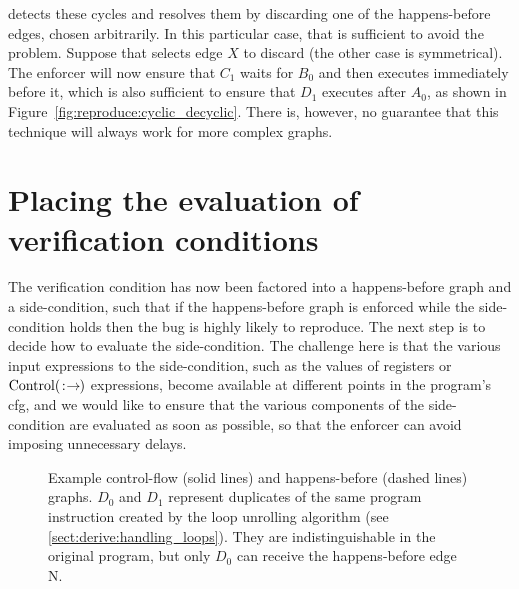 {\Technique} detects these cycles and resolves them by discarding one
of the happens-before edges, chosen arbitrarily.  In this particular
case, that is sufficient to avoid the problem.  Suppose that
{\technique} selects edge $X$ to discard (the other case is
symmetrical).  The enforcer will now ensure that $C_1$ waits for $B_0$
and then executes immediately before it, which is also sufficient to
ensure that $D_1$ executes after $A_0$, as shown in
Figure~\ref{fig:reproduce:cyclic_decyclic}.  There is, however, no
guarantee that this technique will always work for more complex
graphs.

\section{Placing the evaluation of verification conditions}
\label{sect:enforce:place_vcs}

The verification condition has now been factored into a happens-before
graph and a side-condition, such that if the happens-before graph is
enforced while the side-condition holds then the bug is highly likely
to reproduce.  The next step is to decide how to evaluate the
side-condition.  The challenge here is that the various input
expressions to the side-condition, such as the values of registers or
$\mathrm{Control}(\mathrm{}\!:\!\mathrm{\!}\!\rightarrow\!\mathrm{\!})$ expressions, become available at different
points in the program's \gls{cfg}, and we would like to ensure that
the various components of the side-condition are evaluated as soon as
possible, so that the enforcer can avoid imposing unnecessary delays.

\begin{figure}
  \vspace{-8pt}
  \vspace{-4pt}
  \caption{Example control-flow (solid lines) and happens-before
    (dashed lines) graphs.  $D_0$ and $D_1$ represent duplicates of
    the same program instruction created by the loop unrolling
    algorithm (see \autoref{sect:derive:handling_loops}).  They are
    indistinguishable in the original program, but only $D_0$ can
    receive the happens-before edge N.}
  \label{fig:place_conditions_example}
  \vspace{4pt}
\end{figure}

